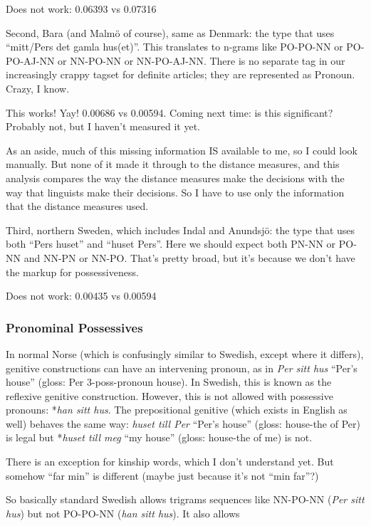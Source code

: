 Does not work: 0.06393 vs 0.07316

Second, Bara (and Malm\"o of course), same as Denmark: the type that
uses ``mitt/Pers det gamla hus(et)''. This translates to n-grams like
PO-PO-NN or PO-PO-AJ-NN or NN-PO-NN or NN-PO-AJ-NN. There is no
separate tag in our increasingly crappy tagset for definite articles;
they are represented as Pronoun. Crazy, I know.

This works! Yay! 0.00686 vs 0.00594. Coming next time: is this
significant? Probably not, but I haven't measured it yet.

As an aside, much of this missing information IS available to me, so I
could look manually. But none of it made it through to the distance
measures, and this analysis compares the way the distance measures
make the decisions with the way that linguists make their
decisions. So I have to use only the information that the distance
measures used.

Third, northern Sweden, which includes Indal and Anundsj\"o: the type
that uses both ``Pers huset'' and ``huset Pers''. Here we should
expect both PN-NN or PO-NN and NN-PN or NN-PO. That's pretty broad,
but it's because we don't have the markup for possessiveness.

Does not work: 0.00435 vs 0.00594

\subsubsection{Pronominal Possessives}

In normal Norse (which is confusingly similar to Swedish, except
where it differs), genitive constructions can have an intervening
pronoun, as in {\it Per sitt hus} ``Per's house'' (gloss: Per
3-poss-pronoun house). In Swedish, this is known as the reflexive genitive
construction. However, this is not allowed with possessive pronouns:
*{\it han sitt hus}. The prepositional genitive (which exists in
English as well) behaves the same way: {\it huset till Per} ``Per's
house'' (gloss: house-the of Per) is legal but *{\it huset till meg}
``my house'' (gloss: house-the of me) is not.

There is an exception for kinship words, which I don't understand
yet. But somehow ``far min'' is different (maybe just because it's not
``min far''?)

So basically standard Swedish allows trigrams sequences like NN-PO-NN
({\it Per sitt hus}) but not  PO-PO-NN ({\it han sitt hus}). It also
allows

